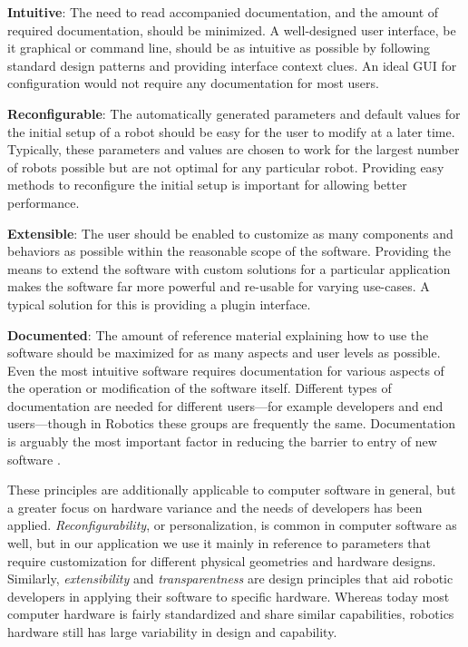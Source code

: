 \documentclass[10pt,journal,compsoc]{joser1}
\begin{document}
{{\bf Intuitive}: The need to read accompanied documentation, and the amount of
required documentation, should be minimized. A well-designed user interface, be
it graphical or command line, should be as intuitive as possible by following
standard design patterns and providing interface context clues. An ideal GUI for
configuration would not require any documentation for most users.

{\bf Reconfigurable}: The automatically generated parameters and default values
for the initial setup of a robot should be easy for the user to modify at a
later time. Typically, these parameters and values are chosen to work for the
largest number of robots possible but are not optimal for any particular robot.
Providing easy methods to reconfigure the initial setup is important for
allowing better performance. 

{\bf Extensible}: The user should be enabled to customize as many components and
behaviors as possible within the reasonable scope of the software. Providing the
means to extend the software with custom solutions for a particular application
makes the software far more powerful and re-usable for varying use-cases. A
typical solution for this is providing a plugin interface.

{\bf Documented}: The amount of reference material explaining how to use the
software should be maximized for as many aspects and user levels as possible.
Even the most intuitive software requires documentation for various aspects of
the operation or modification of the software itself. Different types of
documentation are needed for different users---for example developers and end
users---though in Robotics these groups are frequently the same. Documentation
is arguably the most important factor in reducing the barrier to entry of new
software \cite{forward2002relevance}.

These principles are additionally applicable to computer software in general, but a greater focus on hardware variance and the needs of developers has been applied. \textit{Reconfigurability}, or personalization, is common in computer software as well, but in our application we use it mainly in reference to parameters that require customization for different physical geometries and hardware designs. Similarly, \textit{extensibility} and \textit{transparentness} are design principles that aid robotic developers in applying their software to specific hardware. Whereas today most computer hardware is fairly standardized and share similar capabilities, robotics hardware still has large variability in design and capability.

}
\end{document}
